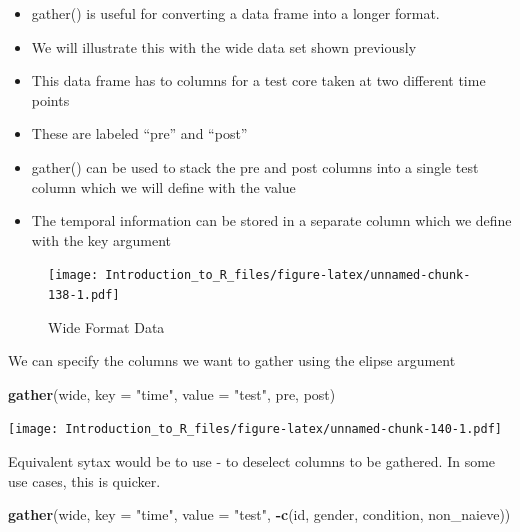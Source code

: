 \documentclass[]{book}
\newenvironment{Shaded}{\begin{snugshade}}{\end{snugshade}}
\newcommand{\DataTypeTok}[1]{\textcolor[rgb]{0.13,0.29,0.53}{#1}}
\newcommand{\KeywordTok}[1]{\textcolor[rgb]{0.13,0.29,0.53}{\textbf{#1}}}
\newcommand{\NormalTok}[1]{#1}
\newcommand{\OperatorTok}[1]{\textcolor[rgb]{0.81,0.36,0.00}{\textbf{#1}}}
\newcommand{\StringTok}[1]{\textcolor[rgb]{0.31,0.60,0.02}{#1}}
\providecommand{\tightlist}{%
  \setlength{\itemsep}{0pt}\setlength{\parskip}{0pt}}
\theoremstyle{definition}
\theoremstyle{definition}
\theoremstyle{definition}
\theoremstyle{remark}
\let\BeginKnitrBlock\begin \let\EndKnitrBlock\end
\begin{document}
\begin{itemize}
\tightlist
\item
  gather() is useful for converting a data frame into a longer format.
\item
  We will illustrate this with the wide data set shown previously
\item
  This data frame has to columns for a test core taken at two different time points
\item
  These are labeled ``pre'' and ``post''
\item
  gather() can be used to stack the pre and post columns into a single test column which we will define with the value
\item
  The temporal information can be stored in a separate column which we define with the key argument
\end{itemize}

\begin{figure}
\centering
\texttt{[image: Introduction\_to\_R\_files/figure-latex/unnamed-chunk-138-1.pdf]}
\caption{\label{fig:unnamed-chunk-138}Wide Format Data}
\end{figure}

\BeginKnitrBlock{example}
\protect\hypertarget{exm:gather1}{}{\label{exm:gather1} }We can specify the columns we want to gather using the elipse argument
\EndKnitrBlock{example}

\begin{Shaded}
\begin{Highlighting}[]
\KeywordTok{gather}\NormalTok{(wide, }\DataTypeTok{key =} \StringTok{"time"}\NormalTok{, }\DataTypeTok{value =} \StringTok{"test"}\NormalTok{, pre, post)}
\end{Highlighting}
\end{Shaded}

\texttt{[image: Introduction\_to\_R\_files/figure-latex/unnamed-chunk-140-1.pdf]}
\BeginKnitrBlock{example}
\protect\hypertarget{exm:gather2}{}{\label{exm:gather2} }Equivalent sytax would be to use - to deselect columns to be gathered. In some use cases, this is quicker.
\EndKnitrBlock{example}

\begin{Shaded}
\begin{Highlighting}[]
\KeywordTok{gather}\NormalTok{(wide, }\DataTypeTok{key =} \StringTok{"time"}\NormalTok{, }\DataTypeTok{value =} \StringTok{"test"}\NormalTok{, }\OperatorTok{-}\KeywordTok{c}\NormalTok{(id, gender, condition, non_naieve))}
\end{Highlighting}
\end{Shaded}
\end{document}
